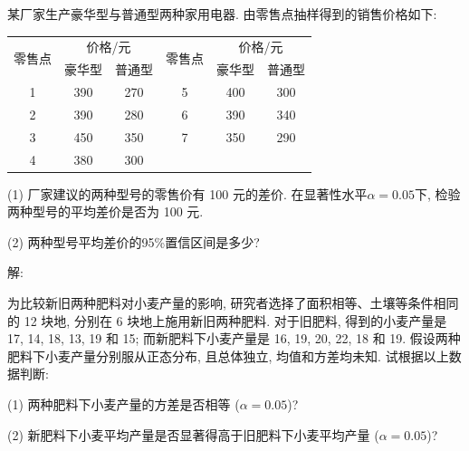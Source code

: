 \documentclass[standard]{ExBook}
\begin{document}
\begin{qitems}
    \begin{bbox}
    \begin{shaded}
        \qitem
某厂家生产豪华型与普通型两种家用电器. 由零售点抽样得到的销售价格如下:
\begin{center}
\setlength{\tabcolsep}{21pt}
\begin{tabular}{c|cc||c|cc}
\hline
\multirow{2}{*}{零售点} & \multicolumn{2}{c||}{价格/元} & \multirow{2}{*}{零售点} & \multicolumn{2}{c}{价格/元} \\ 
\cline{2-3} \cline{5-6}
 & \multicolumn{1}{c}{豪华型} & \multicolumn{1}{c||}{普通型} & & \multicolumn{1}{c}{豪华型} & \multicolumn{1}{c}{普通型} \\ \hline
1 & 390 & 270 & 5 & 400 & 300 \\
2 & 390 & 280 & 6 & 390 & 340 \\
3 & 450 & 350 & 7 & 350 & 290 \\
4 & 380 & 300 &  &  &  \\
\hline
\end{tabular}
\end{center}
(1) 厂家建议的两种型号的零售价有 100 元的差价. 在显著性水平$\alpha=0.05$下, 检验两种型号的平均差价是否为 100 元.

(2) 两种型号平均差价的95\%置信区间是多少?
    \end{shaded}
    \end{bbox}

\vspace{-5em}

    \begin{bbox}
解: 
    \end{bbox}

\vspace{-5em}

    \begin{bbox}
    \begin{shaded}
        \qitem
为比较新旧两种肥料对小麦产量的影响, 研究者选择了面积相等、土壤等条件相同的 12 块地, 分别在 6 块地上施用新旧两种肥料. 对于旧肥料, 得到的小麦产量是 17, 14, 18, 13, 19 和 15; 而新肥料下小麦产量是 16, 19, 20, 22, 18 和 19. 假设两种肥料下小麦产量分别服从正态分布, 且总体独立, 均值和方差均未知. 试根据以上数据判断:

(1) 两种肥料下小麦产量的方差是否相等 ($\alpha=0.05$)?

(2) 新肥料下小麦平均产量是否显著得高于旧肥料下小麦平均产量 ($\alpha=0.05$)?
    \end{shaded}
    \end{bbox}


\end{qitems}
\end{document}
